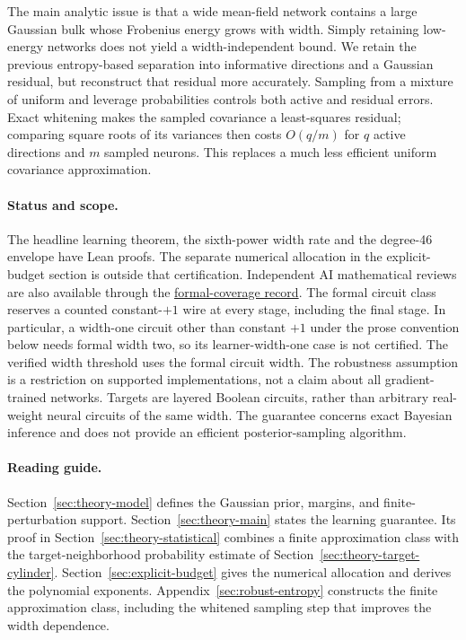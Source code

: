 \documentclass[11pt]{article}
\begin{document}
The main analytic issue is that a wide mean-field network contains a large
Gaussian bulk whose Frobenius energy grows with width. Simply retaining
low-energy networks does not yield a width-independent bound. We retain
the previous entropy-based separation into informative directions and a
Gaussian residual, but reconstruct that residual more accurately. Sampling
from a mixture of uniform and leverage probabilities controls both active
and residual errors. Exact whitening makes the sampled covariance a
least-squares residual; comparing square roots of its variances then costs
$O(q/m)$ for $q$ active directions and $m$ sampled neurons. This replaces a
much less efficient uniform covariance approximation.

\paragraph{Status and scope.}
The headline learning theorem, the sixth-power width rate and the degree-46
envelope have Lean proofs. The separate numerical allocation in the
explicit-budget section is outside that certification. Independent AI
mathematical reviews are also available through the
\href{https://github.com/kaarelh/AI-works/blob/main/neural-network-generalization/lean/review/BatchTwo-coverage.md}{formal-coverage record}.
The formal circuit class reserves a counted constant-$+1$ wire at every
stage, including the final stage. In particular, a width-one
circuit other than constant $+1$ under the prose convention below needs
formal width two, so its
learner-width-one case is not certified. The verified width threshold
uses the formal circuit width.
The robustness assumption is a restriction on supported implementations,
not a claim about all gradient-trained networks. Targets are layered
Boolean circuits, rather than arbitrary real-weight neural circuits of
the same width. The guarantee concerns exact Bayesian inference and does
not provide an efficient posterior-sampling algorithm.

\paragraph{Reading guide.}
Section~\ref{sec:theory-model} defines the Gaussian prior, margins, and
finite-perturbation support. Section~\ref{sec:theory-main} states the learning
guarantee. Its proof in Section~\ref{sec:theory-statistical} combines a finite
approximation class with the target-neighborhood probability estimate of
Section~\ref{sec:theory-target-cylinder}.
Section~\ref{sec:explicit-budget} gives the numerical allocation and derives
the polynomial exponents. Appendix~\ref{sec:robust-entropy} constructs the
finite approximation class, including the whitened sampling step that
improves the width dependence.
\end{document}
